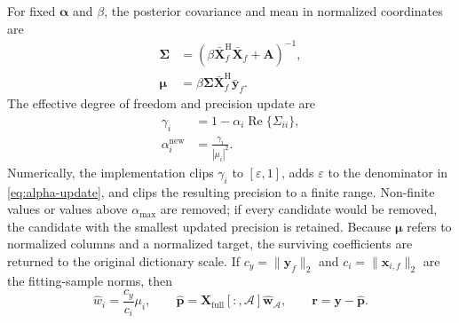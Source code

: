 \documentclass[conference]{IEEEtran}
\newcommand{\vect}[1]{\boldsymbol{#1}}
\newcommand{\mat}[1]{\mathbf{#1}}
\newcommand{\herm}{\mathrm{H}}
\begin{document}
For fixed $\vect\alpha$ and $\beta$, the posterior covariance and mean in normalized coordinates are
\begin{align}
 \mat\Sigma&=\left(\beta\bar{\mat X}_f^{\herm}\bar{\mat X}_f+\mat A\right)^{-1},
 \label{eq:sigma}\\
 \vect\mu&=\beta\mat\Sigma\bar{\mat X}_f^{\herm}\bar{\mat y}_f.
 \label{eq:mu}
\end{align}
The effective degree of freedom and precision update are
\begin{align}
 \gamma_i&=1-\alpha_i\operatorname{Re}\{\Sigma_{ii}\}, \label{eq:gamma}\\
 \alpha_i^{\mathrm{new}}&=\frac{\gamma_i}{|\mu_i|^2}. \label{eq:alpha-update}
\end{align}
Numerically, the implementation clips $\gamma_i$ to $[\varepsilon,1]$, adds $\varepsilon$ to the denominator in \eqref{eq:alpha-update}, and clips the resulting precision to a finite range. Non-finite values or values above $\alpha_{\max}$ are removed; if every candidate would be removed, the candidate with the smallest updated precision is retained. Because $\vect\mu$ refers to normalized columns and a normalized target, the surviving coefficients are returned to the original dictionary scale. If $c_y=\|\mat y_f\|_2$ and $c_i=\|\mat x_{i,f}\|_2$ are the fitting-sample norms, then
\begin{equation}
 \widehat w_i=\frac{c_y}{c_i}\mu_i,\qquad
 \widehat{\mat p}=\mat X_{\mathrm{full}}[:,\mathcal A]
 \widehat{\mat w}_{\mathcal A},\qquad
 \mat r=\mat y-\widehat{\mat p}.
 \label{eq:estimate}
\end{equation}
\end{document}
